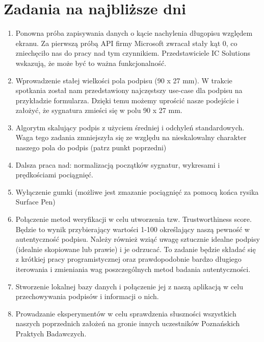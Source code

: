 \documentclass{mwrep}
\begin{document}
{\let\clearpage\relax \chapter{Zadania na najbliższe dni}}
\begin{enumerate} 
    \item Ponowna próba zapisywania danych o kącie nachylenia długopisu względem ekranu. Za pierwszą próbą API firmy Microsoft zwracał stały kąt 0, co zniechęciło nas do pracy nad tym czynnikiem. Przedstawiciele IC Solutions wskazują, że może być to ważna funkcjonalność.
    \item Wprowadzenie stałej wielkości pola podpisu (90 x 27 mm). W trakcie spotkania został nam przedstawiony najczęstszy use-case dla podpisu na przykładzie formularza. Dzięki temu możemy uprościć nasze podejście i założyć, że sygnatura zmieści się w polu 90 x 27 mm.
    \item Algorytm skalujący podpis z użyciem średniej i odchyleń standardowych. Waga tego zadania zmniejszyła się ze względu na nieskalowalny charakter naszego pola do podpis (patrz punkt poprzedni)
    \item Dalsza praca nad: normalizacją początków sygnatur, wykresami i prędkościami pociągnięć.
    \item Wyłączenie gumki (możliwe jest zmazanie pociągnięć za pomocą końca rysika Surface Pen)
    \item Połączenie metod weryfikacji w celu utworzenia tzw. Trustworthiness score. Będzie to wynik przybierający wartości 1-100 określający naszą pewność w autentyczność podpisu. Należy również wziąć uwagę sztucznie idealne podpisy (idealnie skopiowane lub prawie) i je odrzucać.
    To zadanie będzie składać się z krótkiej pracy programistycznej oraz prawdopodobnie bardzo długiego iterowania i zmieniania wag poszczególnych metod badania autentyczności.
    \item Stworzenie lokalnej bazy danych i połączenie jej z naszą aplikacją w celu przechowywania podpisów i informacji o nich.   
    \item Prowadzanie eksperymentów w celu sprawdzenia słuszności wszystkich naszych poprzednich założeń na gronie innych uczestników Poznańskich Praktych Badawczych.
\end{enumerate}
\end{document}
